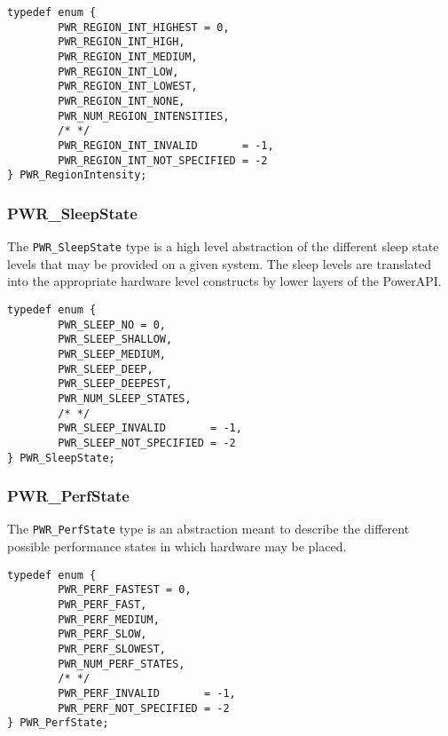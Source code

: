 \begin{center}
\begin{minipage}{.95\linewidth}%
\begin{lstlisting}
typedef enum {
        PWR_REGION_INT_HIGHEST = 0,
        PWR_REGION_INT_HIGH,
        PWR_REGION_INT_MEDIUM,
        PWR_REGION_INT_LOW,
        PWR_REGION_INT_LOWEST,
        PWR_REGION_INT_NONE,
        PWR_NUM_REGION_INTENSITIES,
        /* */
        PWR_REGION_INT_INVALID       = -1,
        PWR_REGION_INT_NOT_SPECIFIED = -2
} PWR_RegionIntensity;
\end{lstlisting}
\end{minipage}
\end{center}


\subsubsection{PWR_SleepState}\label{type:SleepState}

The \texttt{PWR_SleepState} type is a high level abstraction of the different sleep
state levels that may be provided on a given system. The sleep levels are translated into
the appropriate hardware level constructs by lower layers of the PowerAPI. 

\begin{center}
\begin{minipage}{.95\linewidth}%
\begin{lstlisting}
typedef enum {
        PWR_SLEEP_NO = 0,
        PWR_SLEEP_SHALLOW,
        PWR_SLEEP_MEDIUM,
        PWR_SLEEP_DEEP,
        PWR_SLEEP_DEEPEST,
        PWR_NUM_SLEEP_STATES,
        /* */
        PWR_SLEEP_INVALID       = -1,
        PWR_SLEEP_NOT_SPECIFIED = -2
} PWR_SleepState; 
\end{lstlisting}
\end{minipage}
\end{center}


\subsubsection{PWR_PerfState}\label{type:PerfState}

The \texttt{PWR_PerfState} type is an abstraction meant to describe the different
possible performance states in which hardware may be placed.

\begin{center}
\begin{minipage}{.95\linewidth}%
\begin{lstlisting}
typedef enum {
        PWR_PERF_FASTEST = 0,
        PWR_PERF_FAST,
        PWR_PERF_MEDIUM,
        PWR_PERF_SLOW,
        PWR_PERF_SLOWEST,
        PWR_NUM_PERF_STATES,
        /* */
        PWR_PERF_INVALID       = -1,
        PWR_PERF_NOT_SPECIFIED = -2
} PWR_PerfState;
\end{lstlisting}
\end{minipage}
\end{center}


